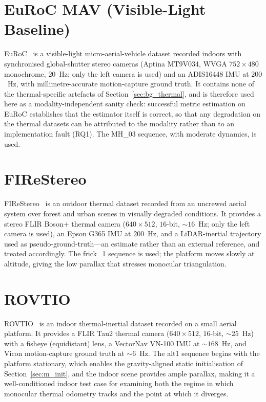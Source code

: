 \section{EuRoC MAV (Visible-Light Baseline)}
\label{sec:d_euroc}
EuRoC~\cite{Burri_2016} is a visible-light micro-aerial-vehicle dataset recorded indoors with synchronised global-shutter stereo cameras (Aptina MT9V034, WVGA $752\times480$ monochrome, $20$~Hz; only the left camera is used) and an ADIS16448 IMU at $200$~Hz, with millimetre-accurate motion-capture ground truth. It contains none of the thermal-specific artefacts of Section~\ref{sec:bg_thermal}, and is therefore used here as a modality-independent sanity check: successful metric estimation on EuRoC establishes that the estimator itself is correct, so that any degradation on the thermal datasets can be attributed to the modality rather than to an implementation fault (RQ1). The MH\_03 sequence, with moderate dynamics, is used.

\section{FIReStereo}
\label{sec:d_firestereo}
FIReStereo~\cite{Dhrafani_2025} is an outdoor thermal dataset recorded from an uncrewed aerial system over forest and urban scenes in visually degraded conditions. It provides a stereo FLIR Boson+ thermal camera ($640\times512$, $16$-bit, $\sim16$~Hz; only the left camera is used), an Epson G365 IMU at $200$~Hz, and a LiDAR-inertial trajectory used as pseudo-ground-truth---an estimate rather than an external reference, and treated accordingly. The frick\_1 sequence is used; the platform moves slowly at altitude, giving the low parallax that stresses monocular triangulation.

\section{ROVTIO}
\label{sec:d_rovtio}
ROVTIO~\cite{ROVTIO} is an indoor thermal-inertial dataset recorded on a small aerial platform. It provides a FLIR Tau2 thermal camera ($640\times512$, $16$-bit, $\sim25$~Hz) with a fisheye (equidistant) lens, a VectorNav VN-100 IMU at $\sim168$~Hz, and Vicon motion-capture ground truth at $\sim6$~Hz. The alt1 sequence begins with the platform stationary, which enables the gravity-aligned static initialisation of Section~\ref{sec:m_init}, and the indoor scene provides ample parallax, making it a well-conditioned indoor test case for examining both the regime in which monocular thermal odometry tracks and the point at which it diverges.

